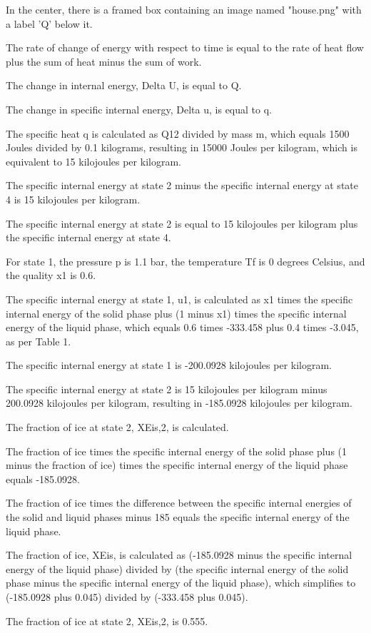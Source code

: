 In the center, there is a framed box containing an image named "house.png" with a label 'Q' below it.

The rate of change of energy with respect to time is equal to the rate of heat flow plus the sum of heat minus the sum of work.

The change in internal energy, Delta U, is equal to Q.

The change in specific internal energy, Delta u, is equal to q.

The specific heat q is calculated as Q12 divided by mass m, which equals 1500 Joules divided by 0.1 kilograms, resulting in 15000 Joules per kilogram, which is equivalent to 15 kilojoules per kilogram.

The specific internal energy at state 2 minus the specific internal energy at state 4 is 15 kilojoules per kilogram.

The specific internal energy at state 2 is equal to 15 kilojoules per kilogram plus the specific internal energy at state 4.

For state 1, the pressure p is 1.1 bar, the temperature Tf is 0 degrees Celsius, and the quality x1 is 0.6.

The specific internal energy at state 1, u1, is calculated as x1 times the specific internal energy of the solid phase plus (1 minus x1) times the specific internal energy of the liquid phase, which equals 0.6 times -333.458 plus 0.4 times -3.045, as per Table 1.

The specific internal energy at state 1 is -200.0928 kilojoules per kilogram.

The specific internal energy at state 2 is 15 kilojoules per kilogram minus 200.0928 kilojoules per kilogram, resulting in -185.0928 kilojoules per kilogram.

The fraction of ice at state 2, XEis,2, is calculated.

The fraction of ice times the specific internal energy of the solid phase plus (1 minus the fraction of ice) times the specific internal energy of the liquid phase equals -185.0928.

The fraction of ice times the difference between the specific internal energies of the solid and liquid phases minus 185 equals the specific internal energy of the liquid phase.

The fraction of ice, XEis, is calculated as (-185.0928 minus the specific internal energy of the liquid phase) divided by (the specific internal energy of the solid phase minus the specific internal energy of the liquid phase), which simplifies to (-185.0928 plus 0.045) divided by (-333.458 plus 0.045).

The fraction of ice at state 2, XEis,2, is 0.555.
